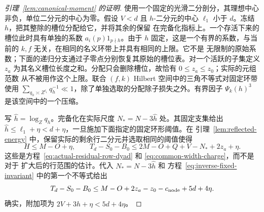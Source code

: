 \begin{proof}[引理~\ref{lem:canonical-moment} 的证明]
使用一个固定的光滑二分剖分，其理想中心非负，单位二分元的中心为零。假设 \(V<d\) 且
\(h\)-二分元的中心 \(\ell_1\) 小于 \(d\)。冻结 \(h\)，把其整除的槽位分配给它，并将其余的保留
在完备化指标上。一个存活下来的槽位此时具有单独的系数 \(a_i(p)1_{p\nmid h}\)。由于 \(h\)
固定，这是一个有界的系数，与当前的 \(k,f\) 无关，在相同的名义环带上并具有相同的上限。它不是
无限制的原始系数；下面的递归分支通过子零点分别恢复其原始的槽位表。对一个活跃的子集定义
\(z_a\) 为其名义槽位长度之和。分配只会删除槽位，故恰有 \(0\le z_a\le z_0\)；实际的元组范数
从不被用作这个上限。联合 \((f,k)\) Hilbert 空间中的三角不等式对固定环带使用
\(\sum_{q_h\asymp Z^{\ell_1}}q_h^{-1}\ll1\)，除了单独选取的分配除子损失之外。有界因子
\(\Psi_k(h)^3\) 是该空间中的一个压缩。

写 \(\widehat h=\log_Zq_h\)。完备化在实际尺度 \(N_*=N-3\widehat h\) 处。其固定支集给出
\(\widehat h\le\ell_1+\eta<d+\eta\)，一旦施加下面指定的固定环形阈值。在
引理~\ref{lem:reflected-energy} 中，保留实际的剩余行二分元并选取相同的阈值使得
\begin{equation}\label{eq:inverse-terminal-width}
 H\le M-O+\eta,\qquad
 T_d-S_0-B_0\le2M-O+Q+V-N_*+2z_a+\eta.
\end{equation}
这些是方程~\eqref{eq:actual-residual-row-dyad} 和 \eqref{eq:common-width-charge}，而不是对于
扩大后的行范围的估计。代入 \(N_*=N-3\widehat h\) 和
方程~\eqref{eq:inverse-fixed-invariant} 中的第一个不等式给出
\begin{equation}\label{old-eq:4.9}
 T_d-S_0-B_0
 \le M-O+2z_a-z_0-c_{\rm node}+5d+4\eta.
\end{equation}
确实，附加项为 \(2V+3\widehat h+\eta<5d+4\eta\)。


\end{proof}
